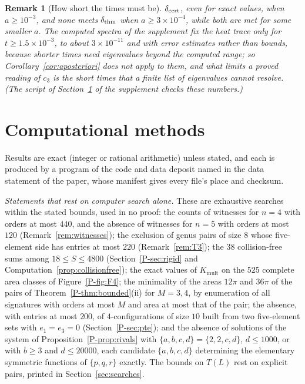 \documentclass[pdflatex,sn-mathphys-num]{sn-jnl}
\newcommand{\pref}[1]{\ref*{P-#1}}%
\newcommand{\Kmult}{K_{\mathrm{mult}}}
\theoremstyle{thmstyleone}%
\theoremstyle{thmstylethree}%
\newtheorem{remark}[proposition]{Remark}%
\providecommand{\Kmult}{K_{\mathrm{mult}}}
\begin{document}
\begin{remark}[How short the times must be]
$\delta_{\rm cert}$, even for exact values, when $a\ge10^{-3}$, and none meets $\delta_{\rm thm}$ when $a\ge3\times10^{-4}$, while both are met for some smaller $a$. The computed spectra of the supplement fix the heat trace only for $t\ge1.5\times10^{-3}$, to about $3\times10^{-11}$ and with error estimates rather than bounds, because shorter times need eigenvalues beyond the computed range; so Corollary~\ref{cor:aposteriori} does not apply to them, and what limits a proved reading of $c_3$ is the short times that a finite list of eigenvalues cannot resolve. (The script of Section~\ref{sec:methods} of the supplement checks these numbers.)
\end{remark}

\section{Computational methods}\label{sec:methods}

Results are exact (integer or rational arithmetic) unless stated, and each is produced by a program of the code and data deposit named in the data statement of the paper, whose manifest gives every file's place and checksum.

\emph{Statements that rest on computer search alone.} These are exhaustive searches within the stated bounds, used in no proof: the counts of witnesses for $n=4$ with orders at most $440$, and the absence of witnesses for $n=5$ with orders at most $120$ (Remark~\ref{rem:witnesses}); the exclusion of genus pairs of size $8$ whose five-element side has entries at most $220$ (Remark~\ref{rem:T3}); the $38$ collision-free sums among $18\le S\le4800$ (Section~\pref{sec:rigid} and Computation~\ref{prop:collisionfree}); the exact values of $\Kmult$ on the $525$ complete area classes of Figure~\pref{fig:F4}; the minimality of the areas $12\pi$ and $36\pi$ of the pairs of Theorem~\pref{thm:bounded}(ii) for $M=3,4$, by enumeration of all signatures with orders at most $M$ and area at most that of the pair; the absence, with entries at most $200$, of $4$-configurations of size $10$ built from two five-element sets with $e_1=e_3=0$ (Section~\pref{sec:pte}); and the absence of solutions of the system of Proposition~\pref{prop:rivals} with $\{a,b,c,d\}=\{2,2,c,d\}$, $d\le1000$, or with $b\ge3$ and $d\le20000$, each candidate $\{a,b,c,d\}$ determining the elementary symmetric functions of $\{p,q,r\}$ exactly. The bounds on $T(L)$ rest on explicit pairs, printed in Section~\ref{sec:searches}.
\end{document}
